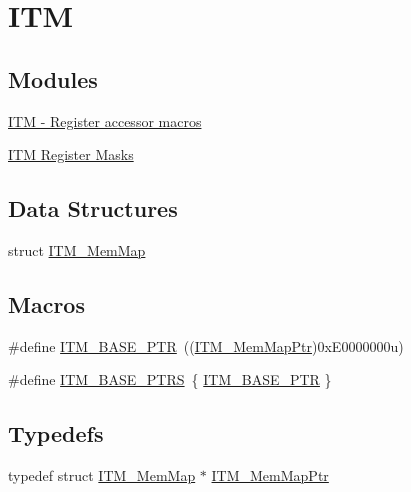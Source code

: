 \hypertarget{group___i_t_m___peripheral}{}\section{I\+T\+M}
\label{group___i_t_m___peripheral}
\subsection*{Modules}
\begin{DoxyCompactItemize}
\item 
\hyperlink{group___i_t_m___register___accessor___macros}{I\+T\+M -\/ Register accessor macros}
\item 
\hyperlink{group___i_t_m___register___masks}{I\+T\+M Register Masks}
\end{DoxyCompactItemize}
\subsection*{Data Structures}
\begin{DoxyCompactItemize}
\item 
struct \hyperlink{struct_i_t_m___mem_map}{I\+T\+M\+\_\+\+Mem\+Map}
\end{DoxyCompactItemize}
\subsection*{Macros}
\begin{DoxyCompactItemize}
\item 
\#define \hyperlink{group___i_t_m___peripheral_gafaddee8fe8b6a898d4e5edc43ee0d703}{I\+T\+M\+\_\+\+B\+A\+S\+E\+\_\+\+P\+T\+R}~((\hyperlink{group___i_t_m___peripheral_ga4a7413c0256960668a95765d8b74e5b3}{I\+T\+M\+\_\+\+Mem\+Map\+Ptr})0x\+E0000000u)
\item 
\#define \hyperlink{group___i_t_m___peripheral_gaaae5001acd70f274892c8fec6778260d}{I\+T\+M\+\_\+\+B\+A\+S\+E\+\_\+\+P\+T\+R\+S}~\{ \hyperlink{group___i_t_m___peripheral_gafaddee8fe8b6a898d4e5edc43ee0d703}{I\+T\+M\+\_\+\+B\+A\+S\+E\+\_\+\+P\+T\+R} \}
\end{DoxyCompactItemize}
\subsection*{Typedefs}
\begin{DoxyCompactItemize}
\item 
typedef struct \hyperlink{struct_i_t_m___mem_map}{I\+T\+M\+\_\+\+Mem\+Map} $\ast$ \hyperlink{group___i_t_m___peripheral_ga4a7413c0256960668a95765d8b74e5b3}{I\+T\+M\+\_\+\+Mem\+Map\+Ptr}
\end{DoxyCompactItemize}


